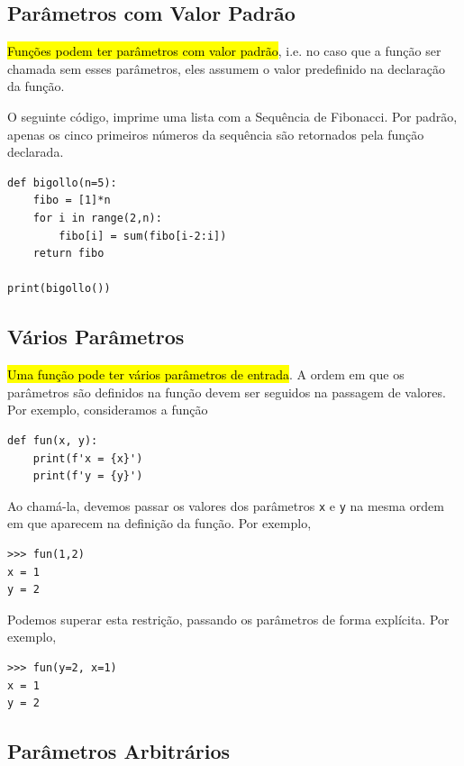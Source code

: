 \subsection{Parâmetros com Valor Padrão}

\hl{Funções podem ter parâmetros com valor padrão}, i.e. no caso que a função ser chamada sem esses parâmetros, eles assumem o valor predefinido na declaração da função.

\begin{ex}
  O seguinte código, imprime uma lista com a Sequência de Fibonacci{\fibonacci}. Por padrão, apenas os cinco primeiros números da sequência são retornados pela função declarada.

\begin{lstlisting}
def bigollo(n=5):
    fibo = [1]*n
    for i in range(2,n):
        fibo[i] = sum(fibo[i-2:i])
    return fibo

print(bigollo())
\end{lstlisting}

\end{ex}

\subsection{Vários Parâmetros}

\hl{Uma função pode ter vários parâmetros de entrada}. A ordem em que os parâmetros são definidos na função devem ser seguidos na passagem de valores. Por exemplo, consideramos a função

\begin{lstlisting}
def fun(x, y):
    print(f'x = {x}')
    print(f'y = {y}')
\end{lstlisting}

Ao chamá-la, devemos passar os valores dos parâmetros \lstinline+x+ e \lstinline+y+ na mesma ordem em que aparecem na definição da função. Por exemplo,

\begin{lstlisting}
>>> fun(1,2)
x = 1
y = 2
\end{lstlisting}

Podemos superar esta restrição, passando os parâmetros de forma explícita. Por exemplo,

\begin{lstlisting}
>>> fun(y=2, x=1)
x = 1
y = 2
\end{lstlisting}

\subsection{Parâmetros Arbitrários}

